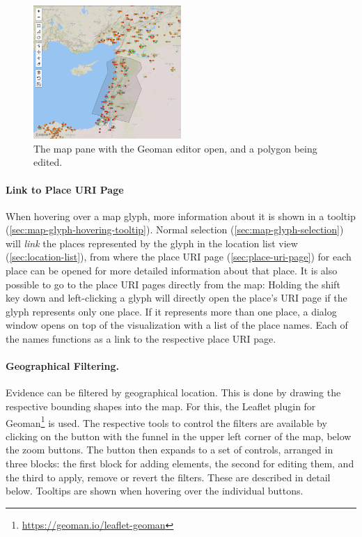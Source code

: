 \begin{figure}[tb]
  \centering
  \includegraphics[width=0.5\textwidth]{../src/assets/visualization-documentation/map-3.png}
  \caption{
    The map pane with the Geoman editor open, and a polygon being edited.
  }
  \label{fig:map-3}
\end{figure}

\paragraph{Link to Place URI Page}
When hovering over a map glyph, more information about it is shown in a tooltip (\cref{sec:map-glyph-hovering-tooltip}).
Normal selection (\cref{sec:map-glyph-selection}) will \emph{link} the places represented by the glyph in the location list view (\cref{sec:location-list}), from where the place URI page (\cref{sec:place-uri-page}) for each place can be opened for more detailed information about that place.
It is also possible to go to the place URI pages directly from the map:
Holding the shift key down and left-clicking a glyph will directly open the place's URI page if the glyph represents only one place.
If it represents more than one place, a dialog window opens on top of the visualization with a list of the place names.
Each of the names functions as a link to the respective place URI page.

\paragraph{Geographical Filtering.}
Evidence can be filtered by geographical location.
This is done by drawing the respective bounding shapes into the map.
For this, the Leaflet plugin for Geoman\footnote{\url{https://geoman.io/leaflet-geoman}} is used.
The respective tools to control the filters are available by clicking on the button with the funnel in the upper left corner of the map, below the zoom buttons.
The button then expands to a set of controls, arranged in three blocks:
the first block for adding elements, the second for editing them, and the third to apply, remove or revert the filters.
These are described in detail below.
Tooltips are shown when hovering over the individual buttons.

